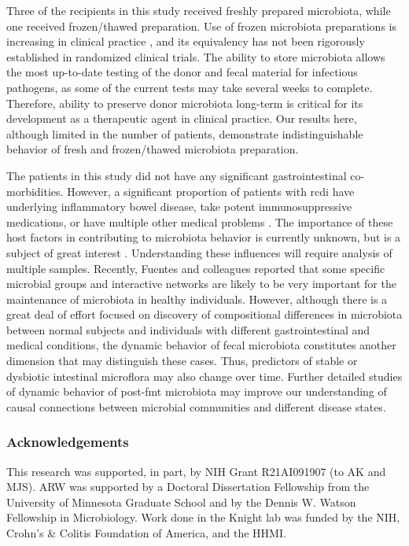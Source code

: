 Three of the recipients in this study received freshly prepared microbiota, while one received frozen/thawed preparation. Use of frozen microbiota preparations is increasing in clinical practice \cite{RN26}, and its equivalency has not been rigorously established in randomized clinical trials. The ability to store microbiota allows the most up-to-date testing of the donor and fecal material for infectious pathogens, as some of the current tests may take several weeks to complete. Therefore, ability to preserve donor microbiota long-term is critical for its development as a therapeutic agent in clinical practice. Our results here, although limited in the number of patients, demonstrate indistinguishable behavior of fresh and frozen/thawed microbiota preparation.

The patients in this study did not have any significant gastrointestinal co-morbidities. However, a significant proportion of patients with \gls{rcdi} have underlying inflammatory bowel disease, take potent immunosuppressive medications, or have multiple other medical problems \cite{RN45, RN85}. The importance of these host factors in contributing to microbiota behavior is currently unknown, but is a subject of great interest \cite{RN154}. Understanding these influences will require analysis of multiple samples. Recently, Fuentes and colleagues \cite{RN53moviefmt} reported that some specific microbial groups and interactive networks are likely to be very important for the maintenance of microbiota in healthy individuals. However, although there is a great deal of effort focused on discovery of compositional differences in microbiota between normal subjects and individuals with different gastrointestinal and medical conditions, the dynamic behavior of fecal microbiota constitutes another dimension that may distinguish these cases. Thus, predictors of stable or dysbiotic intestinal microflora may also change over time. Further detailed studies of dynamic behavior of post-\gls{fmt} microbiota may improve our understanding of causal connections between microbial communities and different disease states.   

\subsubsection{Acknowledgements}

This research was supported, in part, by NIH Grant R21AI091907 (to AK and MJS). ARW was supported by a Doctoral Dissertation Fellowship from the University of Minnesota Graduate School and by the Dennis W. Watson Fellowship in Microbiology. Work done in the Knight lab was funded by the NIH, Crohn's \& Colitis Foundation of America, and the HHMI.  
